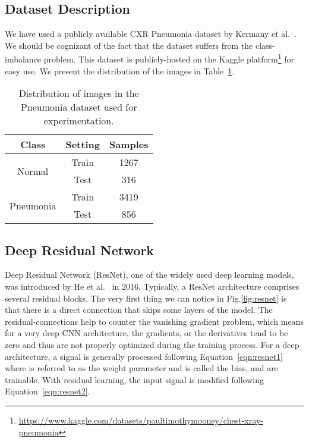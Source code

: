 \documentclass[final,3p,times]{elsarticle}
\begin{document}
\subsection{Dataset Description}
We have used a publicly available CXR Pneumonia dataset by Kermany et al.~\cite{kermany2018identifying}. We should be cognizant of the fact that the dataset suffers from the class-imbalance problem. This dataset is publicly-hosted on the Kaggle platform\footnote{\href{https://www.kaggle.com/datasets/paultimothymooney/chest-xray-pneumonia}{https://www.kaggle.com/datasets/paultimothymooney/chest-xray-pneumonia}} for easy use. We present the distribution of the images in Table~\ref{tab:data}. \begin{table}[ht!]
    \centering
        \caption{Distribution of images in the Pneumonia dataset used for experimentation.}
    \begin{tabular}{c|c|c}
        \toprule
        Class & Setting & Samples \\
        \midrule
        \multirow{2}{*}{Normal} & Train & 1267\\
        & Test & 316\\
        \midrule
       \multirow{2}{*}{Pneumonia} & Train & 3419\\
        & Test & 856\\
        \bottomrule
    \end{tabular}
    \label{tab:data}
\end{table}

\subsection{Deep Residual Network}
Deep Residual Network (ResNet), one of the widely used deep learning {models,} was introduced by He et al.~\cite{he2016deep} in 2016. {Typically,} a ResNet architecture {comprises} several residual blocks. The very first thing we can notice in Fig.\ref{fig:resnet} is that there is a direct connection that skips some layers of the model. The {residual-connections} help to counter the vanishing gradient {problem,} which means {for a} very deep CNN architecture, the gradients, or the derivatives tend to be zero and thus are not properly optimized during the training process. For a deep architecture, a signal is generally processed {following} Equation~\ref{eqn:resnet1} where  is referred to as the weight parameter and  is called the {bias,}  and  are trainable. {With} residual learning, the input signal is modified following Equation~\ref{eqn:resnet2}.
\end{document}

